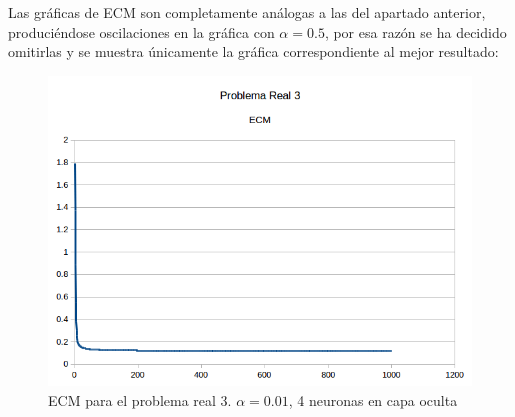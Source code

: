 \documentclass[spanish]{assignment}
\begin{document}
	Las gráficas de ECM son completamente análogas a las del apartado anterior, produciéndose oscilaciones en la gráfica con $\alpha = 0.5$, por esa razón se ha decidido omitirlas y se muestra únicamente la gráfica correspondiente al mejor resultado:	
	\begin{figure}[h]
		\centering
		\includegraphics[scale=0.4]{PR3ECM.png}		
		\caption{ECM para el problema real 3. $\alpha = 0.01$, 4 neuronas en capa oculta}				
	\end{figure}
	
\end{document}
